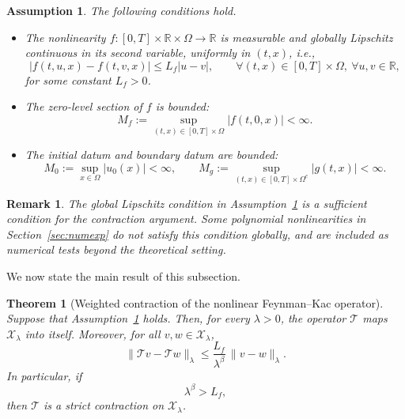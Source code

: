 \documentclass[a4paper,fleqn]{cas-sc}
\newtheorem{theorem}{Theorem}
\newtheorem{assumption}{Assumption}
\newtheorem{remark}{Remark}
\begin{document}
\begin{assumption}\label{ass:weighted-contraction}
The following conditions hold.
\begin{itemize}
    \item[(A1)] The nonlinearity $f:[0,T]\times\mathbb{R}\times\Omega\to\mathbb{R}$ is measurable and globally Lipschitz continuous in its second variable, uniformly in $(t,x)$, i.e.,
    \begin{equation}\label{eq:f-global-lip-final}
    |f(t,u,x)-f(t,v,x)|
    \le L_f |u-v|,
    \qquad
    \forall (t,x)\in[0,T]\times\Omega,\ \forall u,v\in\mathbb{R},
    \end{equation}
    for some constant $L_f>0$.
    
    \item[(A2)] The zero-level section of $f$ is bounded:
    \begin{equation}\label{eq:f-zero-bounded-final}
    M_f:=\sup_{(t,x)\in[0,T]\times\Omega}|f(t,0,x)|<\infty.
    \end{equation}
    
    \item[(A3)] The initial datum and boundary datum are bounded:
    \begin{equation}\label{eq:data-bounded-final}
    M_0:=\sup_{x\in\Omega}|u_0(x)|<\infty,
    \qquad
    M_g:=\sup_{(t,x)\in[0,T]\times\Omega^c}|g(t,x)|<\infty.
    \end{equation}
\end{itemize}
\end{assumption}
\begin{remark}
The global Lipschitz condition in Assumption~\ref{ass:weighted-contraction}
is a sufficient condition for the contraction argument. Some polynomial
nonlinearities in Section~\ref{sec:numexp} do not satisfy this condition
globally, and are included as numerical tests beyond the theoretical setting.
\end{remark}

We now state the main result of this subsection.

\begin{theorem}[Weighted contraction of the nonlinear Feynman--Kac operator]
\label{thm:weighted-contraction-final}
Suppose that Assumption~\ref{ass:weighted-contraction} holds. Then, for every $\lambda>0$, the operator $\mathcal{T}$ maps $\mathcal{X}_\lambda$ into itself. Moreover, for all $v,w\in\mathcal{X}_\lambda$,
\begin{equation}\label{eq:weighted-contraction-est-final}
\|\mathcal{T}v-\mathcal{T}w\|_\lambda
\le
\frac{L_f}{\lambda^\beta}\,\|v-w\|_\lambda .
\end{equation}
In particular, if
\begin{equation}\label{eq:lambda-condition-final}
\lambda^\beta>L_f,
\end{equation}
then $\mathcal{T}$ is a strict contraction on $\mathcal{X}_\lambda$.
\end{theorem}
\end{document}
